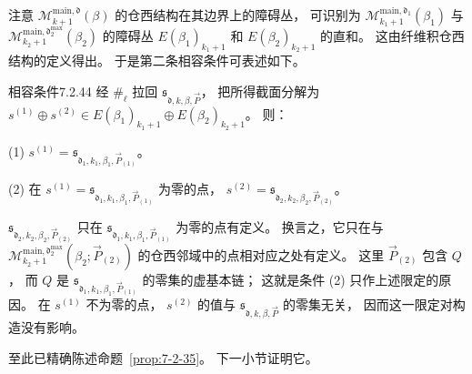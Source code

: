 注意
$\mathcal M^{\mathrm{main},\mathfrak d}_{k+1}(\beta)$
的仓西结构在其边界上的障碍丛，
可识别为
$\mathcal M^{\mathrm{main},\mathfrak d_1}_{k_1+1}(\beta_1)$
与
$\mathcal M^{\mathrm{main},\mathfrak d_2^{\max}}_{k_2+1}(\beta_2)$
的障碍丛
$E(\beta_1)_{k_1+1}$ 和 $E(\beta_2)_{k_2+1}$
的直和。
这由纤维积仓西结构的定义得出。
于是第二条相容条件可表述如下。

\begin{statement}{相容条件}{7.2.44}\label{cond:7-2-44}
%
经 $\#_\ell$ 拉回
$\mathfrak s_{\mathfrak d,k,\beta,\vec P}$，
把所得截面分解为
$s^{(1)}\oplus s^{(2)}
\in E(\beta_1)_{k_1+1}\oplus E(\beta_2)_{k_2+1}$。
则：

\noindent\textup{(1)}\quad
$s^{(1)}
=\mathfrak s_{\mathfrak d_1,k_1,\beta_1,\vec P_{(1)}}$。

\noindent\textup{(2)}\quad
在
$s^{(1)}
=\mathfrak s_{\mathfrak d_1,k_1,\beta_1,\vec P_{(1)}}$
为零的点，
$s^{(2)}
=\mathfrak s_{\mathfrak d_2,k_2,\beta_2,\vec P_{(2)}}$。
\end{statement}

$\mathfrak s_{\mathfrak d_2,k_2,\beta_2,\vec P_{(2)}}$
只在
$\mathfrak s_{\mathfrak d_1,k_1,\beta_1,\vec P_{(1)}}$
为零的点有定义。
换言之，它只在与
$\mathcal M^{\mathrm{main},\mathfrak d_2^{\max}}_{k_2+1}
(\beta_2;\vec P_{(2)})$
的仓西邻域中的点相对应之处有定义。
这里 $\vec P_{(2)}$ 包含 $Q$，
而 $Q$ 是
$\mathfrak s_{\mathfrak d_1,k_1,\beta_1,\vec P_{(1)}}$
的零集的虚基本链；
这就是条件 (2) 只作上述限定的原因。
在 $s^{(1)}$ 不为零的点，
$s^{(2)}$ 的值与
$\mathfrak s_{\mathfrak d,k,\beta,\vec P}$ 的零集无关，
因而这一限定对构造没有影响。

至此已精确陈述命题~\ref{prop:7-2-35}。
下一小节证明它。
